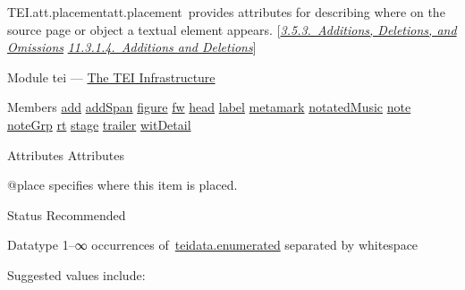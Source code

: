 \begin{reflist}
\item[]\begin{specHead}{TEI.att.placement}{att.placement} provides attributes for describing where on the source page or object a textual element appears. [\textit{\hyperref[COEDADD]{3.5.3.\ Additions, Deletions, and Omissions}} \textit{\hyperref[PHAD]{11.3.1.4.\ Additions and Deletions}}]\end{specHead} 
    \item[{Module}]
  tei — \hyperref[ST]{The TEI Infrastructure}
    \item[{Members}]
  \hyperref[TEI.add]{add} \hyperref[TEI.addSpan]{addSpan} \hyperref[TEI.figure]{figure} \hyperref[TEI.fw]{fw} \hyperref[TEI.head]{head} \hyperref[TEI.label]{label} \hyperref[TEI.metamark]{metamark} \hyperref[TEI.notatedMusic]{notatedMusic} \hyperref[TEI.note]{note} \hyperref[TEI.noteGrp]{noteGrp} \hyperref[TEI.rt]{rt} \hyperref[TEI.stage]{stage} \hyperref[TEI.trailer]{trailer} \hyperref[TEI.witDetail]{witDetail}
    \item[{Attributes}]
  Attributes\hfil\\[-10pt]\begin{sansreflist}
    \item[@place]
  specifies where this item is placed.
\begin{reflist}
    \item[{Status}]
  Recommended
    \item[{Datatype}]
  1–∞ occurrences of \hyperref[TEI.teidata.enumerated]{teidata.enumerated} separated by whitespace
    \item[{Suggested values include:}]
  \begin{description}


\end{description}
\end{reflist}
\end{sansreflist}
\end{reflist}
